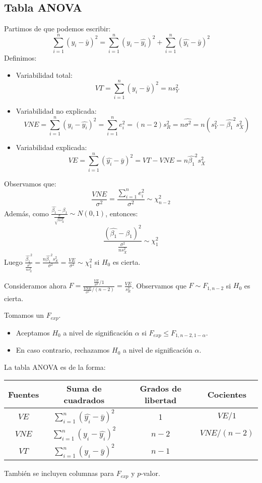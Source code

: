 \subsection*{Tabla ANOVA}
Partimos de que podemos escribir:
$$\sum_{i=1}^n (y_i - \bar{y})^2 = \sum_{i=1}^n (y_i - \hat{y_i})^2 + \sum_{i=1}^n (\hat{y_i} - \bar{y})^2$$
Definimos:
\begin{itemize}
    \item Variabilidad total:
          $$VT = \sum_{i=1}^n (y_i - \bar{y})^2 = ns_Y^2$$
    \item Variabilidad no explicada:
          $$VNE = \sum_{i=1}^n (y_i - \hat{y_i})^2 = \sum_{i=1}^n e_i^2 = (n-2)s_R^2 = n\hat{\sigma^2} = n(s_Y^2 - \hat{\beta_1}^2s_X^2)$$
    \item Variabilidad explicada:
          $$VE = \sum_{i=1}^n (\hat{y_i} - \bar{y})^2 = VT - VNE = n\hat{\beta_1}^2 s_X^2$$
\end{itemize}
Observamos que:
$$\frac{VNE}{\sigma^2} = \frac{\sum_{i=1}^n e_i^2}{\sigma^2} \sim \chi^2_{n-2}$$
Además, como $\frac{\hat{\beta_1} - \beta_1}{\frac{\sigma}{\sqrt{ns_X^2}}} \sim N(0,1)$, entonces:
$$\frac{(\hat{\beta_1} - \beta_1)^2}{\frac{\sigma^2}{ns_X^2}} \sim \chi^2_1$$
Luego $\frac{\hat{\beta_1}^2}{\frac{\sigma^2}{ns_X^2}} = \frac{n\hat{\beta_1}^2s_X^2}{\sigma^2} = \frac{VE}{\sigma^2} \sim \chi^2_1$ si $H_0$ es cierta.

Consideramos ahora $F = \frac{\frac{VE}{\sigma^2} / 1}{\frac{VNE}{\sigma^2} / (n-2)} = \frac{VE}{s_R^2}$.
Observamos que $F \sim F_{1, n-2}$ si $H_0$ es cierta.

Tomamos un $F_{exp}$.
\begin{itemize}
    \item Aceptamos $H_0$ a nivel de significación $\alpha$ si $F_{exp} \leq F_{1, n-2, 1-\alpha}$.
    \item En caso contrario, rechazamos $H_0$ a nivel de significación $\alpha$.
\end{itemize}

La tabla ANOVA es de la forma:
\begin{center}
    \begin{tabular}{| c | c | c | c |}
        \hline
        Fuentes & Suma de cuadrados                   & Grados de libertad & Cocientes   \\
        \hline
        $VE$    & $\sum_{i=1}^n(\hat{y_i}-\bar{y})^2$ & 1                  & $VE/1$      \\
        $VNE$   & $\sum_{i=1}^n(y_i - \hat{y_i})^2$   & $n-2$              & $VNE/(n-2)$ \\
        $VT$    & $\sum_{i=1}^n(y_i - \bar{y})^2$     & $n-1$              &             \\
        \hline
    \end{tabular}
\end{center}
También se incluyen columnas para $F_{exp}$ y $p$-valor.

